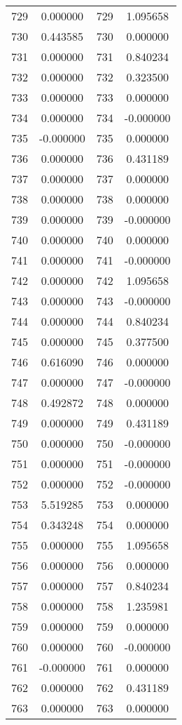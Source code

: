 \documentclass[12pt]{article}
\begin{document}
\begin{longtable}{@{}cccc@{}}
729 & 0.000000 & 729 & 1.095658 \\
730 & 0.443585 & 730 & 0.000000 \\
731 & 0.000000 & 731 & 0.840234 \\
732 & 0.000000 & 732 & 0.323500 \\
733 & 0.000000 & 733 & 0.000000 \\
734 & 0.000000 & 734 & -0.000000 \\
735 & -0.000000 & 735 & 0.000000 \\
736 & 0.000000 & 736 & 0.431189 \\
737 & 0.000000 & 737 & 0.000000 \\
738 & 0.000000 & 738 & 0.000000 \\
739 & 0.000000 & 739 & -0.000000 \\
740 & 0.000000 & 740 & 0.000000 \\
741 & 0.000000 & 741 & -0.000000 \\
742 & 0.000000 & 742 & 1.095658 \\
743 & 0.000000 & 743 & -0.000000 \\
744 & 0.000000 & 744 & 0.840234 \\
745 & 0.000000 & 745 & 0.377500 \\
746 & 0.616090 & 746 & 0.000000 \\
747 & 0.000000 & 747 & -0.000000 \\
748 & 0.492872 & 748 & 0.000000 \\
749 & 0.000000 & 749 & 0.431189 \\
750 & 0.000000 & 750 & -0.000000 \\
751 & 0.000000 & 751 & -0.000000 \\
752 & 0.000000 & 752 & -0.000000 \\
753 & 5.519285 & 753 & 0.000000 \\
754 & 0.343248 & 754 & 0.000000 \\
755 & 0.000000 & 755 & 1.095658 \\
756 & 0.000000 & 756 & 0.000000 \\
757 & 0.000000 & 757 & 0.840234 \\
758 & 0.000000 & 758 & 1.235981 \\
759 & 0.000000 & 759 & 0.000000 \\
760 & 0.000000 & 760 & -0.000000 \\
761 & -0.000000 & 761 & 0.000000 \\
762 & 0.000000 & 762 & 0.431189 \\
763 & 0.000000 & 763 & 0.000000 \\

\end{longtable}
\end{document}
